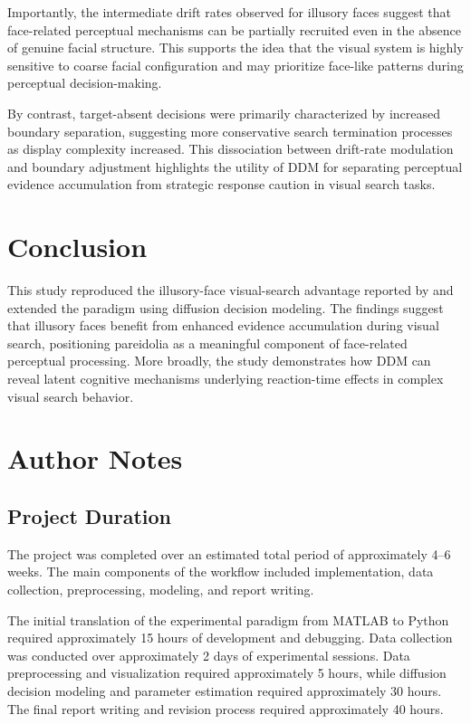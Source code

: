 \documentclass[stu,12pt,floatsintext]{apa7}
\begin{document}
Importantly, the intermediate drift rates observed for illusory faces suggest that face-related perceptual mechanisms can be partially recruited even in the absence of genuine facial structure. This supports the idea that the visual system is highly sensitive to coarse facial configuration and may prioritize face-like patterns during perceptual decision-making.

By contrast, target-absent decisions were primarily characterized by increased boundary separation, suggesting more conservative search termination processes as display complexity increased. This dissociation between drift-rate modulation and boundary adjustment highlights the utility of DDM for separating perceptual evidence accumulation from strategic response caution in visual search tasks.

\section{Conclusion}

This study reproduced the illusory-face visual-search advantage reported by \textcite{Keys2021} and extended the paradigm using diffusion decision modeling. The findings suggest that illusory faces benefit from enhanced evidence accumulation during visual search, positioning pareidolia as a meaningful component of face-related perceptual processing. More broadly, the study demonstrates how DDM can reveal latent cognitive mechanisms underlying reaction-time effects in complex visual search behavior.

\printbibliography

\newpage

\section*{Author Notes}
\subsection*{Project Duration}

The project was completed over an estimated total period of approximately 4–6 weeks. The main components of the workflow included implementation, data collection, preprocessing, modeling, and report writing.

The initial translation of the experimental paradigm from MATLAB to Python required approximately 15 hours of development and debugging. Data collection was conducted over approximately 2 days of experimental sessions. Data preprocessing and visualization required approximately 5 hours, while diffusion decision modeling and parameter estimation required approximately 30 hours. The final report writing and revision process required approximately 40 hours.
\end{document}
